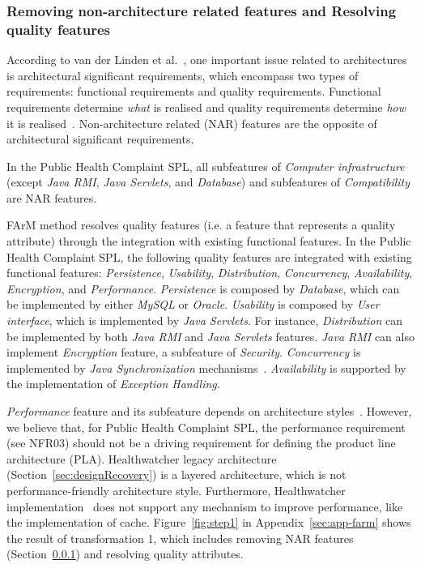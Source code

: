 \documentclass[11pt,twoside]{article}
\begin{document}
 
\subsubsection{Removing non-architecture related features and Resolving quality features}
\label{sec:removingNAR}

According to van der Linden et al.~\cite[Chapter 3.1.2]{Linden:2007:SPL}, one important issue related to architectures is architectural
significant requirements, which encompass two types of requirements: functional requirements and quality requirements. Functional
requirements determine \textit{what} is realised and quality requirements determine \textit{how} it is realised~\cite[Chapter
3.1.2]{Linden:2007:SPL}. Non-architecture related (NAR) features are the opposite of architectural significant requirements.

In the Public Health Complaint SPL, all subfeatures of \textit{Computer infrastructure} (except \textit{Java RMI}, \textit{Java Servlets},
and \textit{Database}) and subfeatures of \textit{Compatibility} are NAR features. 

FArM method resolves quality features (i.e. a feature that represents a quality attribute) through the integration with existing
functional features. In the Public Health Complaint SPL, the following quality features are integrated with existing
functional features: \textit{Persistence}, \textit{Usability}, \textit{Distribution}, \textit{Concurrency}, \textit{Availability},
\textit{Encryption}, and
\textit{Performance}. \textit{Persistence} is composed by \textit{Database}, which can be implemented by either \textit{MySQL} or
\textit{Oracle}. \textit{Usability} is composed by \textit{User interface}, which is implemented by \textit{Java Servlets}. For instance,
\textit{Distribution} can be implemented by both \textit{Java RMI} and \textit{Java Servlets} features. \textit{Java RMI} can also implement
\textit{Encryption} feature, a subfeature of \textit{Security}. \textit{Concurrency} is implemented by \textit{Java Synchronization}
mechanisms~\cite{java}. \textit{Availability} is supported by the implementation of \textit{Exception Handling}.

\textit{Performance} feature and its subfeature depends on architecture styles~\cite[Chapter
4.1]{Bass:1998:SAP}. However, we believe that, for Public Health Complaint SPL, the performance requirement (see NFR03) should not be a
driving requirement for defining the product line architecture (PLA). Healthwatcher legacy architecture (Section~\ref{sec:designRecovery})
is a layered architecture, which is not performance-friendly architecture style. Furthermore, Healthwatcher implementation~\cite{hw-tao}
does not support any mechanism to improve performance, like the implementation of cache. Figure~\ref{fig:step1} in
Appendix~\ref{sec:app-farm} shows the result of transformation 1, which includes removing NAR features (Section~\ref{sec:removingNAR}) and
resolving quality attributes.
\end{document}
